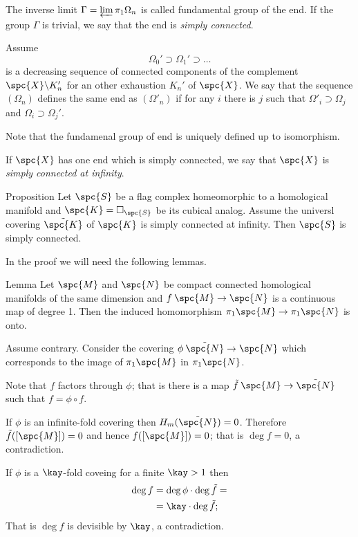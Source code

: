 The inverse limit $\Gamma=\varprojlim \pi_1\Omega_n$ is called fundamental group of the end.
If the group $\Gamma$ is trivial,
we say that the end is \emph{simply connected}.

Assume
\[\Omega_0'\supset \Omega_1'\supset \dots\]
is a decreasing sequence 
of connected components of the complement 
$\spc{X}\backslash K_n'$ for an other exhaustion $K_n'$ of $\spc{X}$.
We say that the sequence $(\Omega_n)$ defines the same end as $(\Omega'_n)$
if for any $i$ there is $j$ such that 
$\Omega'_i\supset \Omega_j$ and $\Omega_i\supset \Omega_j'$.

Note that the fundamenal group of end is uniquely defined up to isomorphism.

If $\spc{X}$ has one end which is simply connected,
we say that $\spc{X}$ is \emph{simply connected at infinity}.


\begin{thm}{Proposition}\label{prop:example-pi_infty}
Let $\spc{S}$ be a flag complex homeomorphic to a homological manifold
and $\spc{K}=\square_{\spc{S}}$ be its cubical analog.
Assume the universl covering $\tilde{\spc{K}}$ of $\spc{K}$ is simply connected at infinity.
Then $\spc{S}$ is simply connected.
\end{thm}


In the proof we will need the following lemmas.

\begin{thm}{Lemma}\label{lem:deg=1=>epi-pi1}
Let $\spc{M}$ and $\spc{N}$ be compact connected homological manifolds of the same dimension
and $f\:\spc{M}\to \spc{N}$ is a continuous map of degree 1.
Then the induced homomorphism $\pi_1\spc{M}\to \pi_1\spc{N}$
is onto.
\end{thm}

Assume contrary.
Consider the covering $\phi\:\tilde{\spc{N}}\to \spc{N}$
which corresponds to the image of $\pi_1\spc{M}$
in $\pi_1\spc{N}$.

Note that $f$ factors through $\phi$;
that is there is a map $\tilde f\:\spc{M} \to \tilde{\spc{N}}$
such that $f=\phi\circ f$.



If $\phi$ is an infinite-fold covering then $H_m(\tilde{\spc{N}})=0$.
Therefore $\tilde f([\spc{M}])=0$ 
and hence $f([\spc{M}])=0$;
that is $\deg f=0$, a contradiction.

If $\phi$ is a $\kay$-fold coveing for a finite $\kay>1$
then 
\begin{align*}
\deg f
&=\deg\phi\cdot\deg \tilde f=
\\
&=\kay \cdot \deg \tilde f;
\end{align*}
That is $\deg f$ is devisible by $\kay$,
a contradiction.\qeds

